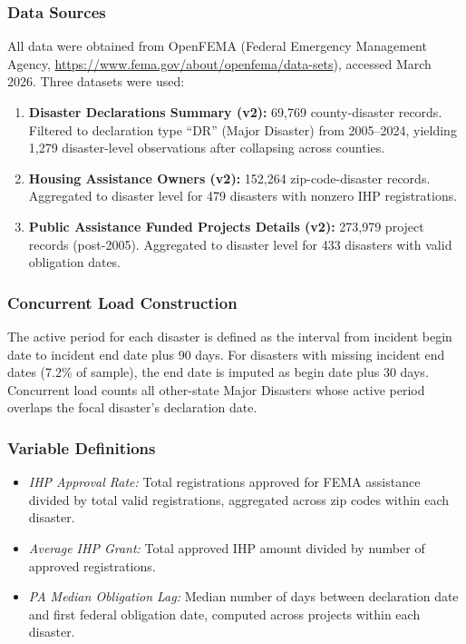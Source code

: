 \documentclass[12pt]{article}
\begin{document}
\subsubsection*{Data Sources} All data were obtained from OpenFEMA (Federal Emergency Management Agency, \url{https://www.fema.gov/about/openfema/data-sets}), accessed March 2026. Three datasets were used:

\begin{enumerate}
\item \textbf{Disaster Declarations Summary (v2):} 69,769 county-disaster records. Filtered to declaration type ``DR'' (Major Disaster) from 2005--2024, yielding 1,279 disaster-level observations after collapsing across counties.
\item \textbf{Housing Assistance Owners (v2):} 152,264 zip-code-disaster records. Aggregated to disaster level for 479 disasters with nonzero IHP registrations.
\item \textbf{Public Assistance Funded Projects Details (v2):} 273,979 project records (post-2005). Aggregated to disaster level for 433 disasters with valid obligation dates.
\end{enumerate}

\subsubsection*{Concurrent Load Construction} The active period for each disaster is defined as the interval from incident begin date to incident end date plus 90 days. For disasters with missing incident end dates (7.2\% of sample), the end date is imputed as begin date plus 30 days. Concurrent load counts all other-state Major Disasters whose active period overlaps the focal disaster's declaration date.

\subsubsection*{Variable Definitions}
\begin{itemize}
\item \textit{IHP Approval Rate:} Total registrations approved for FEMA assistance divided by total valid registrations, aggregated across zip codes within each disaster.
\item \textit{Average IHP Grant:} Total approved IHP amount divided by number of approved registrations.
\item \textit{PA Median Obligation Lag:} Median number of days between declaration date and first federal obligation date, computed across projects within each disaster.
\end{itemize}
\end{document}
